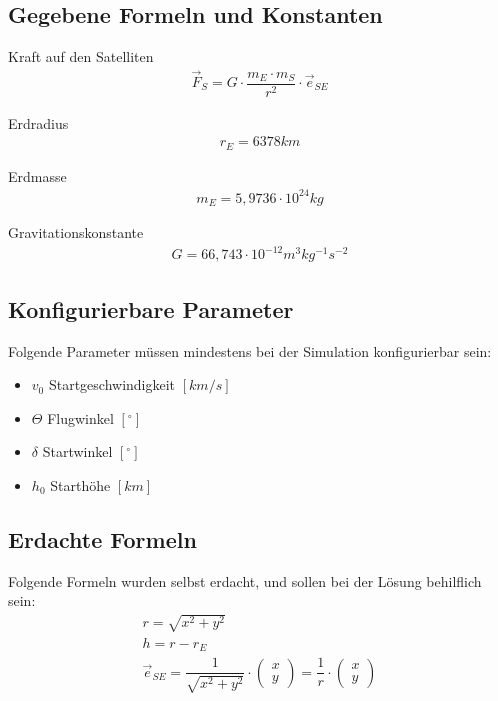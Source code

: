\documentclass[]{scrartcl}
\begin{document}
\subsection{Gegebene Formeln und Konstanten}
Kraft auf den Satelliten
\begin{align}
\vec{F}_{S} = G \cdot \dfrac{m_{E} \cdot m_{S}}{r^2} \cdot \vec{e}_{SE}
\end{align}

Erdradius
\begin{align}
r_{E} = 6378 km
\end{align}

Erdmasse
\begin{align}
m_{E} = 5,9736 \cdot 10^{24} kg
\end{align}

Gravitationskonstante
\begin{align}
G = 66,743 \cdot 10^{-12} m^{3} kg^{-1} s^{-2}
\end{align}

\subsection{Konfigurierbare Parameter}
Folgende Parameter müssen mindestens bei der Simulation konfigurierbar sein:
\begin{itemize}
\item $v_{0}$ Startgeschwindigkeit $[km/s]$
\item $\Theta$ Flugwinkel $[^\circ]$
\item $\delta$ Startwinkel $[^\circ]$
\item $h_{0}$ Starthöhe $[km]$
\end{itemize}

\subsection{Erdachte Formeln}
Folgende Formeln wurden selbst erdacht, und sollen bei der Lösung behilflich sein:
\begin{align}
r = \sqrt{x^2 + y^2} \\
h = r - r_{E} \\
\vec{e}_{SE} = \dfrac{1}{\sqrt{x^2 + y^2}}\cdot \begin{pmatrix}x\\y\end{pmatrix} = \dfrac{1}{r} \cdot \begin{pmatrix}x\\y\end{pmatrix}
\end{align}
\end{document}
